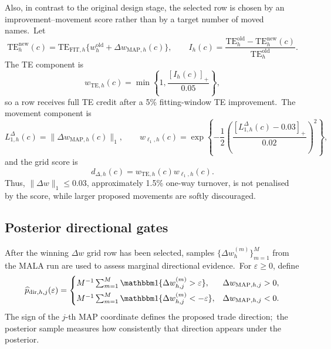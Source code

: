 \documentclass[11pt]{article}
\newcommand{\TE}{\ensuremath{\mathrm{TE}}}
\begin{document}
Also, in contrast to the original design stage, the selected row is chosen by an improvement--movement score rather than by a target number of moved names.\ Let
\begin{equation}
  \TE^{\mathrm{new}}_h(c)
  =
  \TE_{\mathrm{FIT},h}\{w_h^{\mathrm{old}}+\Delta w_{\mathrm{MAP},h}(c)\},
  \qquad
  I_h(c)=
  \frac{\TE^{\mathrm{old}}_h-\TE^{\mathrm{new}}_h(c)}{\TE^{\mathrm{old}}_h}.
  \label{eq:workflow-dw-improvement}
\end{equation}
The TE component is
\begin{equation}
  w_{\TE,h}(c)
  =
  \min\left\{1,\frac{[I_h(c)]_+}{0.05}\right\},
  \label{eq:workflow-dw-te-score}
\end{equation}
so a row receives full TE credit after a 5\% fitting-window TE improvement.\ The movement component is
\begin{equation}
  L^{\Delta}_{1,h}(c)=\|\Delta w_{\mathrm{MAP},h}(c)\|_1,
  \qquad
  w_{\ell_1,h}(c)
  =
  \exp\left\{-\frac12
  \left(
  \frac{[L^{\Delta}_{1,h}(c)-0.03]_+}{0.02}
  \right)^2
  \right\},
  \label{eq:workflow-dw-l1-score}
\end{equation}
and the grid score is
\begin{equation}
  d_{\Delta,h}(c)=w_{\TE,h}(c)w_{\ell_1,h}(c).
  \label{eq:workflow-dw-score}
\end{equation}
Thus, \(\|\Delta w\|_1\leq0.03\), approximately 1.5\% one-way turnover, is not penalised by the score, while larger proposed movements are softly discouraged.\ 

\subsection{Posterior directional gates}\label{subsec:workflow-directional-gates}

After the winning \(\Delta w\) grid row has been selected, samples \(\{\Delta w_h^{(m)}\}_{m=1}^M\) from the MALA run are used to assess marginal directional evidence.\ For \(\varepsilon\geq0\), define
\begin{equation}
  \widehat p_{\mathrm{dir},h,j}(\varepsilon)
  =
  \begin{cases}
  M^{-1}\sum_{m=1}^M\mathbbm 1\{\Delta w_{h,j}^{(m)}>\varepsilon\},
  & \Delta w_{\mathrm{MAP},h,j}>0,\\[4pt]
  M^{-1}\sum_{m=1}^M\mathbbm 1\{\Delta w_{h,j}^{(m)}<-\varepsilon\},
  & \Delta w_{\mathrm{MAP},h,j}<0.
  \end{cases}
  \label{eq:workflow-directional-prob}
\end{equation}
The sign of the $j$-th MAP coordinate defines the proposed trade direction;\ the posterior sample measures how consistently that direction appears under the posterior.
\end{document}
